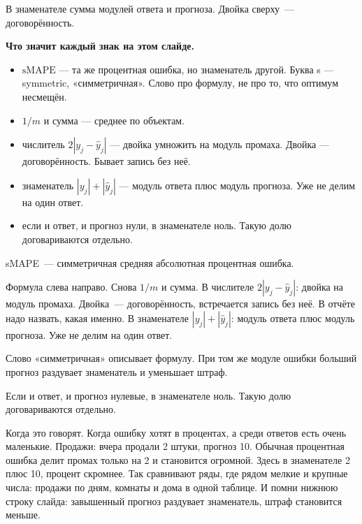 \documentclass[11pt,a4paper]{article}
\newcommand{\slidehead}[2]{\par\vspace{4mm}{\color{navy}\large\bfseries Слайд #1. #2}\par\vspace{1mm}}
\newcommand{\screen}[1]{\par{\color{ink}\small #1\par}\vspace{1mm}}
\newcommand{\say}[1]{\begin{saybox}#1\end{saybox}}
\newenvironment{signs}{\begin{signbox}{\bfseries Что значит каждый знак на этом слайде.}\par\begin{itemize}[leftmargin=1.15em,itemsep=2pt,topsep=3pt,parsep=0pt]}{\end{itemize}\end{signbox}}
\begin{document}
\slidehead{25}{sMAPE}
\screen{В знаменателе сумма модулей ответа и прогноза. Двойка сверху~--- договорённость.}
\begin{signs}
\item \(\mathrm{sMAPE}\) — та же процентная ошибка, но знаменатель другой. Буква s — symmetric, «симметричная». Слово про формулу, не про то, что оптимум несмещён.
\item \(1/m\) и сумма — среднее по объектам.
\item числитель \(2|y_j-\hat y_j|\) — двойка умножить на модуль промаха. Двойка — договорённость. Бывает запись без неё.
\item знаменатель \(|y_j|+|\hat y_j|\) — модуль ответа плюс модуль прогноза. Уже не делим на один ответ.
\item если и ответ, и прогноз нули, в знаменателе ноль. Такую долю договариваются отдельно.
\end{signs}
\say{sMAPE~--- симметричная средняя абсолютная процентная ошибка.

Формула слева направо. Снова \(1/m\) и сумма. В числителе \(2|y_j-\hat y_j|\): двойка на модуль промаха. Двойка~--- договорённость, встречается запись без неё. В отчёте надо назвать, какая именно. В знаменателе \(|y_j|+|\hat y_j|\): модуль ответа плюс модуль прогноза. Уже не делим на один ответ.

Слово «симметричная» описывает формулу. При том же модуле ошибки больший прогноз раздувает знаменатель и уменьшает штраф.

Если и ответ, и прогноз нулевые, в знаменателе ноль. Такую долю договариваются отдельно.

Когда это говорят. Когда ошибку хотят в процентах, а среди ответов есть очень маленькие. Продажи: вчера продали 2 штуки, прогноз 10. Обычная процентная ошибка делит промах только на 2 и становится огромной. Здесь в знаменателе 2 плюс 10, процент скромнее. Так сравнивают ряды, где рядом мелкие и крупные числа: продажи по дням, комнаты и дома в одной таблице. И помни нижнюю строку слайда: завышенный прогноз раздувает знаменатель, штраф становится меньше.}
\end{document}

